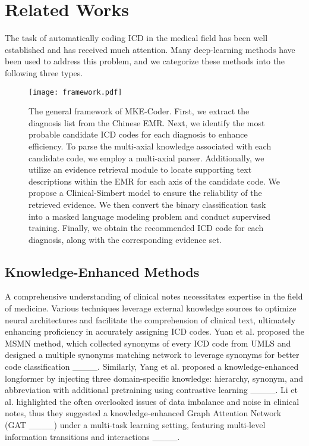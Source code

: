\section{Related Works}
\label{sec:Related Works}
The task of automatically coding ICD in the medical field has been well established and has received much attention. Many deep-learning methods have been used to address this problem, and we categorize these methods into the following three types.

    \begin{figure*}[t]
    \centering
    \texttt{[image: framework.pdf]}
    \caption{The general framework of MKE-Coder. First, we extract the diagnosis list from the Chinese EMR. Next, we identify the most probable candidate ICD codes for each diagnosis to enhance efficiency. To parse the multi-axial knowledge associated with each candidate code, we employ a multi-axial parser. Additionally, we utilize an evidence retrieval module to locate supporting text descriptions within the EMR for each axis of the candidate code. We propose a Clinical-Simbert model to ensure the reliability of the retrieved evidence. We then convert the binary classification task into a masked language modeling problem and conduct supervised training. Finally, we obtain the recommended ICD code for each diagnosis, along with the corresponding evidence set. }
    \label{fig:framework}
    \end{figure*}

\subsection{Knowledge-Enhanced Methods}

A comprehensive understanding of clinical notes necessitates expertise in the field of medicine. Various techniques leverage external knowledge sources to optimize neural architectures and facilitate the comprehension of clinical text, ultimately enhancing proficiency in accurately assigning ICD codes. 
Yuan et al. proposed the MSMN method, which collected synonyms of every ICD code from UMLS and designed a multiple synonyms matching network to leverage synonyms for better code classification ____. Similarly, Yang et al. proposed a knowledge-enhanced longformer by injecting three domain-specific knowledge: hierarchy, synonym, and abbreviation with additional pretraining using contrastive learning ____. Li et al. highlighted the often overlooked issues of data imbalance and noise in clinical notes, thus they suggested a knowledge-enhanced Graph Attention Network (GAT ____) under a multi-task learning setting, featuring multi-level information transitions and interactions ____. 


